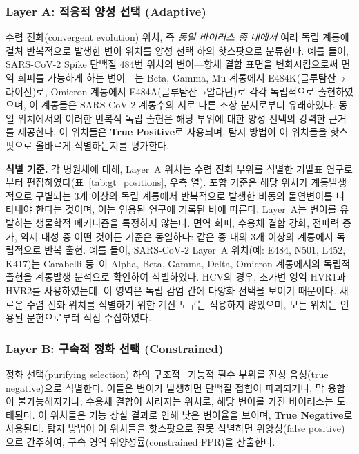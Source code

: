 \subsubsection{Layer A: 적응적 양성 선택 (Adaptive)}

수렴 진화(convergent evolution) 위치, 즉 \textit{동일 바이러스 종 내에서} 여러 독립 계통에 걸쳐 반복적으로 발생한 변이 위치를 양성 선택 하의 핫스팟으로 분류한다.
예를 들어, SARS-CoV-2 Spike 단백질 484번 위치의 변이---항체 결합 표면을 변화시킴으로써 면역 회피를 가능하게 하는 변이---는 Beta, Gamma, Mu 계통에서 E484K(글루탐산→라이신)로, Omicron 계통에서 E484A(글루탐산→알라닌)로 각각 독립적으로 출현하였으며, 이 계통들은 SARS-CoV-2 계통수의 서로 다른 조상 분지로부터 유래하였다. 동일 위치에서의 이러한 반복적 독립 출현은 해당 부위에 대한 양성 선택의 강력한 근거를 제공한다.
이 위치들은 \textbf{True Positive}로 사용되며, 탐지 방법이 이 위치들을 핫스팟으로 올바르게 식별하는지를 평가한다.

\textbf{식별 기준.}
각 병원체에 대해, Layer~A 위치는 수렴 진화 부위를 식별한 기발표 연구로부터 편집하였다(표~\ref{tab:gt_positions}, 우측 열).
포함 기준은 해당 위치가 계통발생적으로 구별되는 3개 이상의 독립 계통에서 반복적으로 발생한 비동의 돌연변이를 나타내야 한다는 것이며, 이는 인용된 연구에 기록된 바에 따른다.
Layer~A는 변이를 유발하는 생물학적 메커니즘을 특정하지 않는다. 면역 회피, 수용체 결합 강화, 전파력 증가, 약제 내성 중 어떤 것이든 기준은 동일하다: 같은 종 내의 3개 이상의 계통에서 독립적으로 반복 출현.
예를 들어, SARS-CoV-2 Layer~A 위치(예: E484, N501, L452, K417)는 Carabelli 등~\cite{carabelli2023convergent}이 Alpha, Beta, Gamma, Delta, Omicron 계통에서의 독립적 출현을 계통발생 분석으로 확인하여 식별하였다.
HCV의 경우, 초가변 영역 HVR1과 HVR2를 사용하였는데, 이 영역은 독립 감염 간에 다양화 선택을 보이기 때문이다.
새로운 수렴 진화 위치를 식별하기 위한 계산 도구는 적용하지 않았으며, 모든 위치는 인용된 문헌으로부터 직접 수집하였다.

\subsubsection{Layer B: 구속적 정화 선택 (Constrained)}

정화 선택(purifying selection) 하의 구조적·기능적 필수 부위를 진성 음성(true negative)으로 식별한다.
이들은 변이가 발생하면 단백질 접힘이 파괴되거나, 막 융합이 불가능해지거나, 수용체 결합이 사라지는 위치로, 해당 변이를 가진 바이러스는 도태된다.
이 위치들은 기능 상실 결과로 인해 낮은 변이율을 보이며, \textbf{True Negative}로 사용된다.
탐지 방법이 이 위치들을 핫스팟으로 잘못 식별하면 위양성(false positive)으로 간주하여, 구속 영역 위양성률(constrained FPR)을 산출한다.

